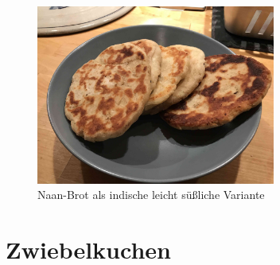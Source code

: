 \documentclass[a4paper, 12pt]{scrbook} 								%
\numberwithin{equation}{section} 									%
\begin{document}
		\begin{figure}[h]
			\centering
			\includegraphics[width = 0.7\textwidth]{media/naan_brot.JPG}
			\caption{Naan-Brot als indische leicht süßliche Variante}
		\end{figure}

		\newpage


		\section{Zwiebelkuchen}	\label{zwiebelkuchen}
\end{document}
